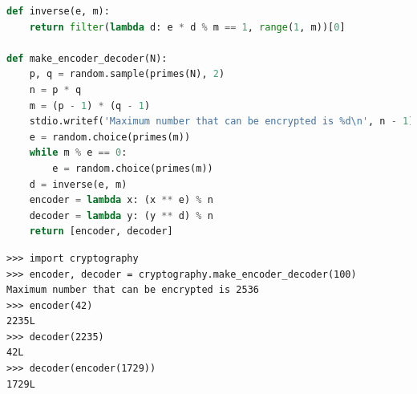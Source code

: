 \documentclass[8pt,a4paper,compress,handout]{beamer}
\begin{document}
\begin{frame}[fragile]
\begin{lstlisting}[language=Python]
def inverse(e, m):
    return filter(lambda d: e * d % m == 1, range(1, m))[0]

def make_encoder_decoder(N):
    p, q = random.sample(primes(N), 2)
    n = p * q
    m = (p - 1) * (q - 1)
    stdio.writef('Maximum number that can be encrypted is %d\n', n - 1)
    e = random.choice(primes(m))
    while m % e == 0:
        e = random.choice(primes(m))
    d = inverse(e, m)
    encoder = lambda x: (x ** e) % n
    decoder = lambda y: (y ** d) % n
    return [encoder, decoder]
\end{lstlisting}

\begin{lstlisting}[language={}]
>>> import cryptography
>>> encoder, decoder = cryptography.make_encoder_decoder(100)
Maximum number that can be encrypted is 2536
>>> encoder(42)
2235L
>>> decoder(2235)
42L
>>> decoder(encoder(1729))
1729L
\end{lstlisting}
\end{frame}
\end{document}
